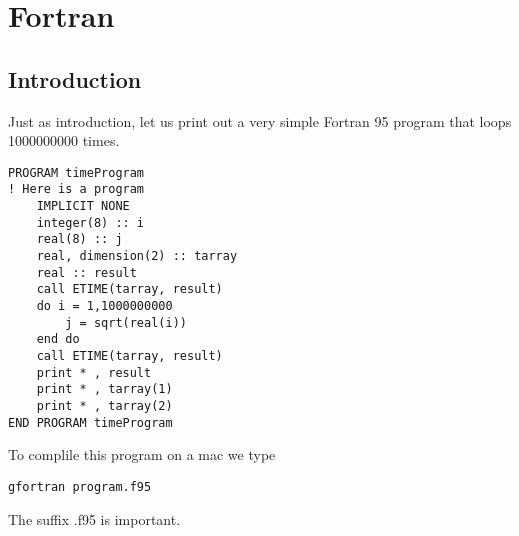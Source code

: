 \chapter{Fortran}

\section{Introduction}

Just as introduction, let us print out a very simple Fortran 95 program that loops 1000000000 times. 
\begin{lstlisting}[label=static,caption=Simple fortran program]
PROGRAM timeProgram
! Here is a program 
	IMPLICIT NONE
	integer(8) :: i
	real(8) :: j
	real, dimension(2) :: tarray
	real :: result
	call ETIME(tarray, result)
	do i = 1,1000000000
		j = sqrt(real(i))
	end do
	call ETIME(tarray, result)
	print * , result
	print * , tarray(1)
	print * , tarray(2)
END PROGRAM timeProgram
\end{lstlisting}
To complile this program on a mac we type
\begin{verbatim}
gfortran program.f95
\end{verbatim}
The suffix .f95 is important.
